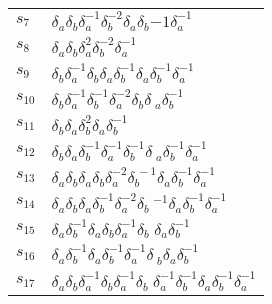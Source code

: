 \documentclass{article}
\begin{document}
\begin{center}
\begin{tabular}{ll}
$s_{7}$ & $\delta_a^{}\delta_b^{}\delta_a^{-1}\delta_b^{-2}\delta_a^{}\delta_b^\
{-1}\delta_a^{-1}$ \\
$s_{8}$ & $\delta_a^{}\delta_b^{}\delta_a^{2}\delta_b^{-2}\delta_a^{-1}$ \\
$s_{9}$ & $\delta_b^{}\delta_a^{-1}\delta_b^{}\delta_a^{}\delta_b^{-1}\delta_a^\
{}\delta_b^{-1}\delta_a^{-1}$ \\
$s_{10}$ & $\delta_b^{}\delta_a^{-1}\delta_b^{-1}\delta_a^{-2}\delta_b^{}\delta\
_a^{}\delta_b^{-1}$ \\
$s_{11}$ & $\delta_b^{}\delta_a^{}\delta_b^{2}\delta_a^{}\delta_b^{-1}$ \\
$s_{12}$ & $\delta_b^{}\delta_a^{}\delta_b^{-1}\delta_a^{-1}\delta_b^{-1}\delta\
_a^{}\delta_b^{-1}\delta_a^{-1}$ \\
$s_{13}$ & $\delta_a^{}\delta_b^{}\delta_a^{}\delta_b^{}\delta_a^{-2}\delta_b^{\
-1}\delta_a^{}\delta_b^{-1}\delta_a^{-1}$ \\
$s_{14}$ & $\delta_a^{}\delta_b^{}\delta_a^{}\delta_b^{-1}\delta_a^{-2}\delta_b\
^{-1}\delta_a^{}\delta_b^{-1}\delta_a^{-1}$ \\
$s_{15}$ & $\delta_a^{}\delta_b^{-1}\delta_a^{}\delta_b^{}\delta_a^{-1}\delta_b\
^{}\delta_a^{}\delta_b^{-1}$ \\
$s_{16}$ & $\delta_a^{}\delta_b^{-1}\delta_a^{}\delta_b^{-1}\delta_a^{-1}\delta\
_b^{}\delta_a^{}\delta_b^{-1}$ \\
$s_{17}$ & $\delta_a^{}\delta_b^{}\delta_a^{-1}\delta_b^{}\delta_a^{-1}\delta_b\
^{}\delta_a^{-1}\delta_b^{-1}\delta_a^{}\delta_b^{-1}\delta_a^{-1}$ \\
\bottomrule
\end{tabular}
\end{center}

\thispagestyle{empty}
\end{document}
